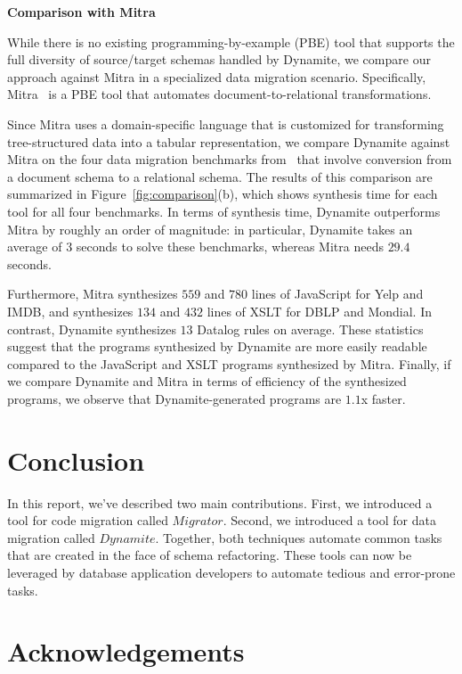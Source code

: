 \documentclass[]{article}
\begin{document}
                \noindent\textbf{Comparison with Mitra}

                    While there is no existing programming-by-example (PBE) tool that supports the full diversity of source/target schemas handled by Dynamite, we compare our approach against Mitra in a specialized data migration scenario. Specifically, Mitra~\cite{mitra-vldb18} is a PBE tool that automates document-to-relational transformations. 

                    Since Mitra uses a domain-specific language that is customized for transforming tree-structured data into a tabular representation,  we compare Dynamite against Mitra on the four data migration benchmarks from~\cite{mitra-vldb18} that involve conversion from a document  schema to a relational schema.  The results of this comparison   are summarized in Figure~\ref{fig:comparison}(b), which shows  synthesis time for each tool for all  four benchmarks. In terms of synthesis time, Dynamite outperforms Mitra by roughly an order of magnitude:  in particular, Dynamite takes an average of  $3$ seconds to solve these benchmarks, whereas Mitra needs  $29.4$ seconds.

                    Furthermore, Mitra synthesizes $559$ and $780$ lines of JavaScript for Yelp and IMDB, and synthesizes $134$ and $432$ lines of XSLT for DBLP and Mondial. In contrast, Dynamite  synthesizes $13$ Datalog rules on average. These statistics suggest that the programs synthesized by Dynamite are more easily readable compared to the JavaScript and XSLT programs synthesized by Mitra.
                    Finally, if we compare Dynamite and Mitra in terms of efficiency of the synthesized programs, we observe that  Dynamite-generated programs are $1.1$x faster. 

    \section{Conclusion}

        In this report, we've described two main contributions. First, we introduced a tool for code migration called $Migrator$. Second, we introduced a tool for data migration called $Dynamite$. Together, both techniques automate common tasks that are created in the face of schema refactoring. These tools can now be leveraged by database application developers to automate tedious and error-prone tasks. 

    \section{Acknowledgements}
\end{document}
